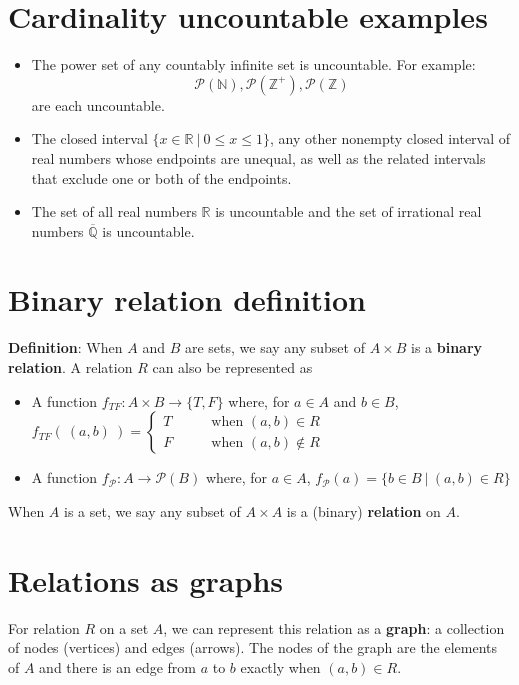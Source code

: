 \documentclass[12pt, oneside]{article}
\begin{document}
\section*{Cardinality uncountable examples}


\begin{itemize}
    \item The power set of any countably infinite set is uncountable. For example:
    \[
        \mathcal{P}(\mathbb{N}), \mathcal{P}(\mathbb{Z^+}), \mathcal{P}(\mathbb{Z})
    \]
    are each uncountable.
    \item The closed interval $\{x \in \mathbb{R} ~|~ 0 \leq x \leq 1\}$, any other nonempty closed interval of real numbers whose endpoints are 
    unequal, as well as the related intervals that exclude one or both of the endpoints.
    \item The set of all real numbers $\mathbb{R}$ is uncountable and the set of irrational
    real numbers $\overline{\mathbb{Q}}$ is uncountable.
\end{itemize} \vfill
\section*{Binary relation definition}


{\bf Definition}: When $A$ and $B$ are sets, we say any subset of $A \times B$ is a {\bf binary relation}. 
A relation $R$ can also be represented as

\begin{itemize}
\item A function $f_{TF} : A \times B \to \{T, F\}$
where, for $a \in A$ and $b \in B$, $f_{TF}(~(a,b)~) = 
\begin{cases} 
    T \qquad&\text{when } (a,b) \in R \\
    F \qquad&\text{when } (a,b) \notin R
\end{cases}$
\item A function $f_{\mathcal{P}} : A   \to \mathcal{P}(B)$ where, for $a \in A$, 
$f_{\mathcal{P}}( a ) = \{ b \in B ~|~ (a,b) \in R \}$
\end{itemize}

When $A$ is a set, we say any subset of $A \times A$ is a (binary) {\bf relation} on $A$.

 \vfill
\section*{Relations as graphs}


For relation $R$ on a set $A$, we can represent this relation as a
{\bf graph}: a collection of nodes (vertices) and edges (arrows). The 
nodes of the graph are the elements of $A$ and 
there is an edge from $a$ to $b$ exactly when $(a,b) \in R$.
\end{document}
